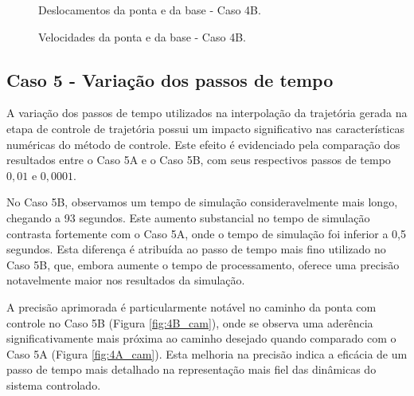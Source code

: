 \begin{figure}[H]
    \centering
    \hfill
    \caption{Deslocamentos da ponta e da base - Caso 4B.}
    \label{fig:5B_des}
\end{figure}


\begin{figure}[H]
    \centering
    \hfill
    \caption{Velocidades da ponta e da base - Caso 4B.}
    \label{fig:5B_vel}
\end{figure}

\subsection{Caso 5 - Variação dos passos de tempo}

A variação dos passos de tempo utilizados na interpolação da trajetória gerada na etapa de controle de trajetória possui um impacto significativo nas características numéricas do método de controle. Este efeito é evidenciado pela comparação dos resultados entre o Caso 5A e o Caso 5B, com seus respectivos passos de tempo \(0,01\) e \(0,0001\).

No Caso 5B, observamos um tempo de simulação consideravelmente mais longo, chegando a 93 segundos. Este aumento substancial no tempo de simulação contrasta fortemente com o Caso 5A, onde o tempo de simulação foi inferior a 0,5 segundos. Esta diferença é atribuída ao passo de tempo mais fino utilizado no Caso 5B, que, embora aumente o tempo de processamento, oferece uma precisão notavelmente maior nos resultados da simulação.

A precisão aprimorada é particularmente notável no caminho da ponta com controle no Caso 5B (Figura \ref{fig:4B_cam}), onde se observa uma aderência significativamente mais próxima ao caminho desejado quando comparado com o Caso 5A (Figura \ref{fig:4A_cam}). Esta melhoria na precisão indica a eficácia de um passo de tempo mais detalhado na representação mais fiel das dinâmicas do sistema controlado.

